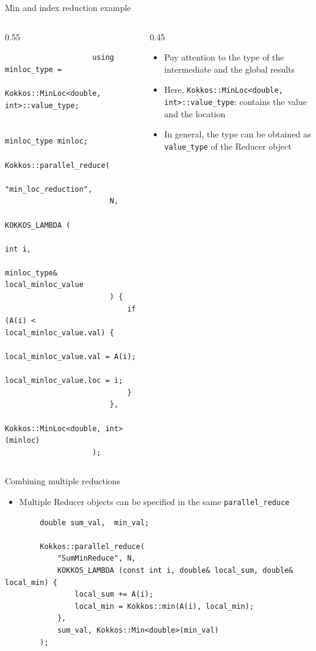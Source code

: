 \documentclass[
    aspectratio=169,
    \createHandout
]{beamer}
\begin{document}

\begin{frame}[fragile]{Min and index reduction example}
    \begin{columns}
        \begin{column}{0.55\linewidth}
            \begin{verbatim}
                    using minloc_type =
                        Kokkos::MinLoc<double, int>::value_type;

                    minloc_type minloc;
                    Kokkos::parallel_reduce(
                        "min_loc_reduction",
                        N,
                        KOKKOS_LAMBDA (
                            int i,
                            minloc_type& local_minloc_value
                        ) {
                            if (A(i) < local_minloc_value.val) {
                                local_minloc_value.val = A(i);
                                local_minloc_value.loc = i;
                            }
                        },
                        Kokkos::MinLoc<double, int>(minloc)
                    );
                \end{verbatim}
        \end{column}
        \begin{column}{0.45\linewidth}
            \begin{itemize}
                \item Pay attention to the type of the intermediate and the global results
                \item Here, \texttt{Kokkos::MinLoc<double, int>::value\_type}: contains the value and the location
                \item In general, the type can be obtained as \texttt{value\_type} of the Reducer object
            \end{itemize}
        \end{column}
    \end{columns}
\end{frame}


\begin{frame}[fragile]{Combining multiple reductions}
    \begin{itemize}
        \item Multiple Reducer objects can be specified in the same \texttt{parallel\_reduce}
    \end{itemize}
    \begin{verbatim}
        double sum_val,  min_val;

        Kokkos::parallel_reduce(
            "SumMinReduce", N,
            KOKKOS_LAMBDA (const int i, double& local_sum, double& local_min) {
                local_sum += A(i);
                local_min = Kokkos::min(A(i), local_min);
            },
            sum_val, Kokkos::Min<double>(min_val)
        );
    \end{verbatim}
\end{frame}
\end{document}
